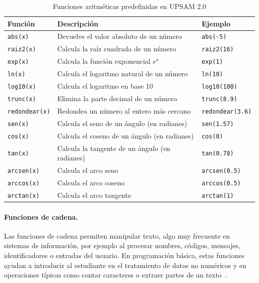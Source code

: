 \documentclass[12pt,twoside]{book}
\begin{document}
							\begin{table}[h]
								\centering
								\caption{Funciones aritméticas predefinidas en UPSAM 2.0}
								\label{tab:upsam_func_arit}
								\begin{tabular}{lll}
									\hline
									\textbf{Función} & \textbf{Descripción} & \textbf{Ejemplo} \\
									\hline
									\texttt{abs(x)} & Devuelve el valor absoluto de un número & \texttt{abs(-5)} \\
									\texttt{raiz2(x)} & Calcula la raíz cuadrada de un número & \texttt{raiz2(16)} \\
									\texttt{exp(x)} & Calcula la función exponencial $e^x$ & \texttt{exp(1)} \\
									\texttt{ln(x)} & Calcula el logaritmo natural de un número & \texttt{ln(10)} \\
									\texttt{log10(x)} & Calcula el logaritmo en base 10 & \texttt{log10(100)} \\
									\texttt{trunc(x)} & Elimina la parte decimal de un número & \texttt{trunc(8.9)} \\
									\texttt{redondear(x)} & Redondea un número al entero más cercano & \texttt{redondear(3.6)} \\
									\texttt{sen(x)} & Calcula el seno de un ángulo (en radianes) & \texttt{sen(1.57)} \\
									\texttt{cos(x)} & Calcula el coseno de un ángulo (en radianes) & \texttt{cos(0)} \\
									\texttt{tan(x)} & Calcula la tangente de un ángulo (en radianes) & \texttt{tan(0.78)} \\
									\texttt{arcsen(x)} & Calcula el arco seno & \texttt{arcsen(0.5)} \\
									\texttt{arccos(x)} & Calcula el arco coseno & \texttt{arccos(0.5)} \\
									\texttt{arctan(x)} & Calcula el arco tangente & \texttt{arctan(1)} \\
									\hline
								\end{tabular}
							\end{table}
				
						\paragraph{Funciones de cadena.}
							Las funciones de cadena permiten manipular texto, algo muy frecuente en sistemas de información, por ejemplo al procesar nombres, códigos, mensajes, identificadores o entradas del usuario. En programación básica, estas funciones ayudan a introducir al estudiante en el tratamiento de datos no numéricos y en operaciones típicas como contar caracteres o extraer partes de un texto~\cite{Farrell2018Programming,Joyanes2007Fundamentos}.
							
\end{document}
